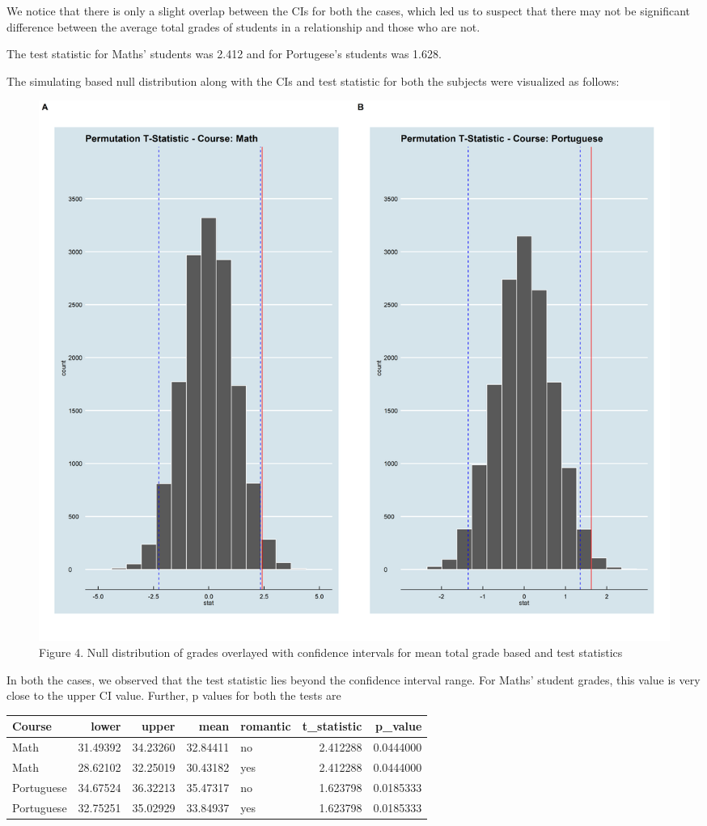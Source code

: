 \documentclass[]{article}
\begin{document}
We notice that there is only a slight overlap between the CIs for both
the cases, which led us to suspect that there may not be significant
difference between the average total grades of students in a
relationship and those who are not.

The test statistic for Maths' students was 2.412 and for Portugese's
students was 1.628.

The simulating based null distribution along with the CIs and test
statistic for both the subjects were visualized as follows:

\begin{figure}

{\centering \includegraphics[width=0.8\linewidth]{../results/figures/permutation_test_comparison} 

}

\caption{Figure 4. Null distribution of grades overlayed with confidence intervals for mean total grade based and test statistics}\label{fig:null_distributions}
\end{figure}

In both the cases, we observed that the test statistic lies beyond the
confidence interval range. For Maths' student grades, this value is very
close to the upper CI value. Further, p values for both the tests are

\begin{table}[H]
\centering
\begin{tabular}{l|r|r|r|l|r|r}
\hline
Course & lower & upper & mean & romantic & t\_statistic & p\_value\\
\hline
Math & 31.49392 & 34.23260 & 32.84411 & no & 2.412288 & 0.0444000\\
\hline
Math & 28.62102 & 32.25019 & 30.43182 & yes & 2.412288 & 0.0444000\\
\hline
Portuguese & 34.67524 & 36.32213 & 35.47317 & no & 1.623798 & 0.0185333\\
\hline
Portuguese & 32.75251 & 35.02929 & 33.84937 & yes & 1.623798 & 0.0185333\\
\hline
\end{tabular}
\end{table}
\end{document}
